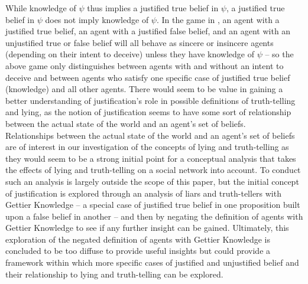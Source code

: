 \documentclass[12pt, titlepage, twoside, a4paper]{report}
\begin{document}
While knowledge of $\psi$ thus implies a justified true belief in $\psi$, a justified true belief in $\psi$ does not imply knowledge of $\psi$. In the game in , an agent with a justified true belief, an agent with a justified false belief, and an agent with an unjustified true or false belief will all behave as sincere or insincere agents (depending on their intent to deceive) unless they have knowledge of $\psi$ – so the above game only distinguishes between agents with and without an intent to deceive and between agents who satisfy one specific case of justified true belief (knowledge) and all other agents. There would seem to be value in gaining a better understanding of justification's role in possible definitions of truth-telling and lying, as the notion of justification seems to have some sort of relationship between the actual state of the world and an agent's set of beliefs.\\
Relationships between the actual state of the world and an agent's set of beliefs are of interest in our investigation of the concepts of lying and truth-telling as they would seem to be a strong initial point for a conceptual analysis that takes the effects of lying and truth-telling on a social network into account. To conduct such an analysis is largely outside the scope of this paper, but the initial concept of justification is explored through an analysis of liars and truth-tellers with Gettier Knowledge – a special case of justified true belief in one proposition built upon a false belief in another – and then by negating the definition of agents with Gettier Knowledge to see if any further insight can be gained.  Ultimately, this exploration of the negated definition of agents with Gettier Knowledge is concluded to be too diffuse to provide useful insights but could provide a framework within which more specific cases of justified and unjustified belief and their relationship to lying and truth-telling can be explored. 
\end{document}
